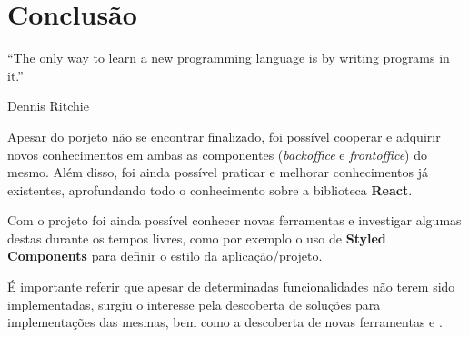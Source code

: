 \chapter{Conclusão}

\begin{flushright}
	\begin{quotebox50}
		\large
		“The only way to learn a new programming language is by writing programs in it.”

		\tcblower
		Dennis Ritchie
	\end{quotebox50}
\end{flushright}

Apesar do porjeto não se encontrar finalizado, foi possível cooperar e adquirir novos conhecimentos em ambas as componentes (\textit{backoffice} e \textit{frontoffice}) do mesmo. Além disso, foi ainda possível praticar e melhorar conhecimentos já existentes, aprofundando todo o conhecimento sobre a biblioteca \textbf{React}.

Com o projeto foi ainda possível conhecer novas ferramentas e investigar algumas destas durante os tempos livres, como por exemplo o uso de \textbf{Styled Components} para definir o estilo da aplicação/projeto.

É importante referir que apesar de determinadas funcionalidades não terem sido implementadas, surgiu o interesse pela descoberta de soluções para implementações das mesmas, bem como a descoberta de novas ferramentas e \textit{}.



